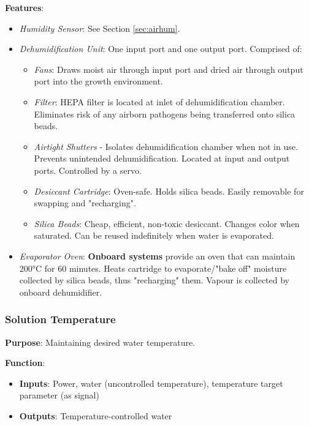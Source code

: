\documentclass{report}
\begin{document}
\textbf{Features}:
\begin{itemize}
    \item \textit{Humidity Sensor}: See Section \ref{sec:airhum}.
    \item \textit{Dehumidification Unit}: One input port and one output port. Comprised of:
    \begin{itemize}
        \item \textit{Fans}: Draws moist air through input port and dried air through output port into the growth environment.
        \item \textit{Filter}: HEPA filter is located at inlet of dehumidification chamber. Eliminates risk of any airborn pathogens being transferred onto silica beads.
        \item \textit{Airtight Shutters} - Isolates dehumidification chamber when not in use. Prevents unintended dehumidification. Located at input and output ports. Controlled by a servo.
        \item \textit{Desiccant Cartridge}: Oven-safe. Holds silica beads. Easily removable for swapping and "recharging".
        \item \textit{Silica Beads}: Cheap, efficient, non-toxic desiccant. Changes color when saturated. Can be reused indefinitely when water is evaporated.
    \end{itemize}
    \item \textit{Evaporator Oven}: \textbf{Onboard systems} provide an oven that can maintain 200°C for 60 minutes. Heats cartridge to evaporate/"bake off" moisture collected by silica beads, thus "recharging" them. Vapour is collected by onboard dehumidifier.
\end{itemize}

\newpage

\subsubsection{Solution Temperature}
\label{sec:watertemp}

\textbf{Purpose}: Maintaining desired water temperature.

\textbf{Function}: 
\begin{itemize}
    \item \textbf{Inputs}: Power, water (uncontrolled temperature), temperature target parameter (as signal)
    \item \textbf{Outputs}: Temperature-controlled water
\end{itemize}
\end{document}
